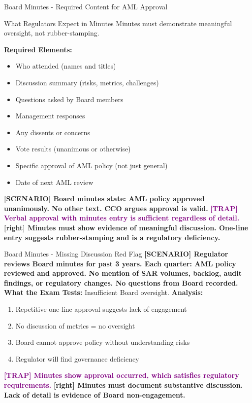 \documentclass[11pt,a4paper]{beamer}
\newcommand{\trap}[1]{\textcolor{purple}{\textbf{[TRAP] #1}}}
\newcommand{\correct}[1]{\textcolor{green!50!black}{\textbf{[right] #1}}}
\newcommand{\scenario}[1]{\textcolor{blue!70!black}{\textbf{[SCENARIO] #1}}}
\begin{document}

\begin{frame}{Board Minutes - Required Content for AML Approval}
\begin{block}{What Regulators Expect in Minutes}
Minutes must demonstrate meaningful oversight, not rubber-stamping.
\end{block}
\textbf{Required Elements:}
\begin{itemize}
\item Who attended (names and titles)
\item Discussion summary (risks, metrics, challenges)
\item Questions asked by Board members
\item Management responses
\item Any dissents or concerns
\item Vote results (unanimous or otherwise)
\item Specific approval of AML policy (not just general)
\item Date of next AML review
\end{itemize}
\scenario{Board minutes state: AML policy approved unanimously. No other text. CCO argues approval is valid.}
\trap{Verbal approval with minutes entry is sufficient regardless of detail.}
\correct{Minutes must show evidence of meaningful discussion. One-line entry suggests rubber-stamping and is a regulatory deficiency.}
\end{frame}

\begin{frame}{Board Minutes - Missing Discussion Red Flag}
\scenario{Regulator reviews Board minutes for past 3 years. Each quarter: AML policy reviewed and approved. No mention of SAR volumes, backlog, audit findings, or regulatory changes. No questions from Board recorded.}
\vspace{0.2cm}
\textbf{What the Exam Tests:} Insufficient Board oversight.
\vspace{0.2cm}
\textbf{Analysis:}
\begin{enumerate}
\item Repetitive one-line approval suggests lack of engagement
\item No discussion of metrics = no oversight
\item Board cannot approve policy without understanding risks
\item Regulator will find governance deficiency
\end{enumerate}
\trap{Minutes show approval occurred, which satisfies regulatory requirements.}
\correct{Minutes must document substantive discussion. Lack of detail is evidence of Board non-engagement.}
\end{frame}
\end{document}
